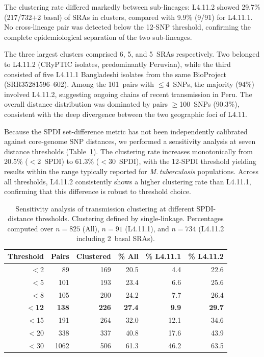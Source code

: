 \documentclass[11pt,a4paper]{article}
\newcommand{\lignee}[1]{\textsf{#1}}
\begin{document}
The clustering rate differed markedly between sub-lineages:
\lignee{L4.11.2} showed 29.7\% (217/732$+$2 basal) of SRAs in clusters,
compared with 9.9\% (9/91) for \lignee{L4.11.1}.  No cross-lineage
pair was detected below the 12-SNP threshold, confirming the complete
epidemiological separation of the two sub-lineages.

The three largest clusters comprised 6, 5, and 5~SRAs respectively.
Two belonged to \lignee{L4.11.2} (CRyPTIC isolates, predominantly
Peruvian), while the third consisted of five \lignee{L4.11.1}
Bangladeshi isolates from the same BioProject (SRR35281596--602).
Among the 101~pairs with $\leq$4~SNPs, the majority (94\%) involved
\lignee{L4.11.2}, suggesting ongoing chains of recent transmission in
Peru.  The overall distance distribution was dominated by pairs
$\geq$100~SNPs (90.3\%), consistent with the deep divergence between
the two geographic foci of \lignee{L4.11}.

Because the SPDI set-difference metric has not been independently
calibrated against core-genome SNP distances, we performed a
sensitivity analysis at seven distance thresholds
(Table~\ref{tab:clustering_sensitivity}).  The clustering rate
increases monotonically from 20.5\% ($<$2~SPDI) to 61.3\% ($<$30~SPDI),
with the 12-SPDI threshold yielding results within the range typically
reported for \textit{M.\,tuberculosis} populations.  Across all
thresholds, \lignee{L4.11.2} consistently shows a higher clustering
rate than \lignee{L4.11.1}, confirming that this difference is robust
to threshold choice.

\begin{table}[htbp!]
	\centering
	\small
	\caption{Sensitivity analysis of transmission clustering at different
		SPDI-distance thresholds.  Clustering defined by single-linkage.
		Percentages computed over $n = 825$ (All), $n = 91$ (\lignee{L4.11.1}),
		and $n = 734$ (\lignee{L4.11.2} including 2~basal SRAs).}
	\label{tab:clustering_sensitivity}
	\begin{tabular}{rrrrrr}
		\toprule
		\textbf{Threshold} & \textbf{Pairs} & \textbf{Clustered} & \textbf{\% All} & \textbf{\% \lignee{L4.11.1}} & \textbf{\% \lignee{L4.11.2}} \\
		\midrule
		$<$2   &  89 & 169 & 20.5 &  4.4 & 22.6 \\
		$<$5   & 101 & 193 & 23.4 &  6.6 & 25.6 \\
		$<$8   & 105 & 200 & 24.2 &  7.7 & 26.4 \\
		\textbf{$<$12} & \textbf{138} & \textbf{226} & \textbf{27.4} & \textbf{9.9} & \textbf{29.7} \\
		$<$15  & 191 & 264 & 32.0 & 12.1 & 34.6 \\
		$<$20  & 338 & 337 & 40.8 & 17.6 & 43.9 \\
		$<$30  & 1062 & 506 & 61.3 & 46.2 & 63.5 \\
		\bottomrule
	\end{tabular}
\end{table}
\end{document}
